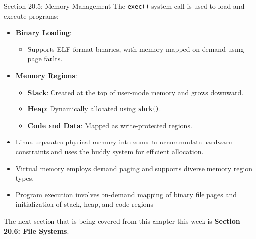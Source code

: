 \begin{notes}{Section 20.5: Memory Management}
    The \texttt{exec()} system call is used to load and execute programs:
    \begin{itemize}
        \item \textbf{Binary Loading}:
        \begin{itemize}
            \item Supports ELF-format binaries, with memory mapped on demand using page faults.
        \end{itemize}
        \item \textbf{Memory Regions}:
        \begin{itemize}
            \item \textbf{Stack}: Created at the top of user-mode memory and grows downward.
            \item \textbf{Heap}: Dynamically allocated using \texttt{sbrk()}.
            \item \textbf{Code and Data}: Mapped as write-protected regions.
        \end{itemize}
    \end{itemize}
    
    \begin{highlight}
        \begin{itemize}
            \item Linux separates physical memory into zones to accommodate hardware constraints and uses the buddy system for efficient allocation.
            \item Virtual memory employs demand paging and supports diverse memory region types.
            \item Program execution involves on-demand mapping of binary file pages and initialization of stack, heap, and code regions.
        \end{itemize}
    \end{highlight}
\end{notes}

The next section that is being covered from this chapter this week is \textbf{Section 20.6: File Systems}.

